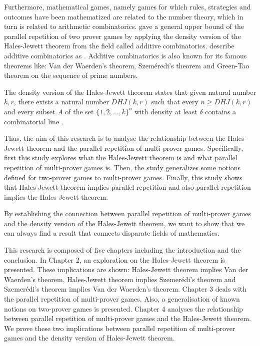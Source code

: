 Furthermore, mathematical games, namely games for which rules, strategies and outcomes have been mathematized are related to the number theory,
which in turn is related to  arithmetic combinatorics.
\cite{verbitsky1996towards} gave a general  upper bound of the parallel repetition of  two prover games by applying the density version of the Hales-Jewett theorem from the field called additive combinatorics. \cite*{taoadditive} describe
additive combinatorics  as  . Additive combinatorics is also known for its famous theorems like: Van der Waerden's theorem, Szeméredi's theorem and Green-Tao theorem on the sequence of prime numbers.


The density version of the Hales-Jewett theorem states that given natural number $k,r$, there exists a natural number $DHJ(k,r)$ such that every $n\geq DHJ(k,r)$ and every subset $A$ of the set $\{1,2,\ldots,k\}^n$ with density at least $\delta$  contains a  combinatorial line  \citep{polymath2012new}.

Thus, the aim of this research is to analyse the relationship between the Hales-Jewett theorem and the parallel repetition of multi-prover games. Specifically, first  this study explores what  the Hales-Jewett theorem is and what  parallel repetition of multi-prover games is. Then, the study  generalizes some notions defined for two-prover games to multi-prover games.  Finally, this study shows that Hales-Jewett theorem implies parallel repetition and also parallel repetition implies the Hales-Jewett theorem.



By establishing the connection between parallel repetition of multi-prover games and the density version of the Hales-Jewett theorem, we want to show that we can always find a result that connects disparate fields of mathematics.

This research is composed of five chapters including the introduction and the conclusion. In Chapter 2, an exploration on the Hales-Jewett theorem is presented. These implications are shown:  Hales-Jewett theorem implies Van der Waerden's theorem, Hales-Jewett theorem implies Szemerédi's theorem and Szemerédi's theorem implies Van der Waerden's theorem. Chapter 3 deals with the parallel repetition of  multi-prover games. Also, a generalisation of  known notions on two-prover games is presented. Chapter 4 analyses the relationship between parallel repetition of multi-prover games and the Hales-Jewett theorem.  We prove these two implications between  parallel repetition of multi-prover games and the density version of Hales-Jewett theorem. 



%
%





